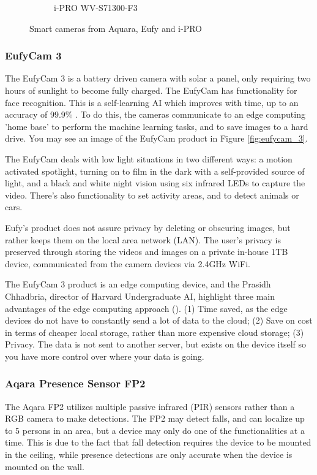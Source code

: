 \begin{figure}[H]
\begin{subfigure}{0.2\textwidth}
        \caption{\centering i-PRO WV-S71300-F3}
        \label{fig:i-PRO_camera}
    \end{subfigure}
    \caption{\centering Smart cameras from Aquara, Eufy and i-PRO}
    \label{fig:solutions_on_the_market}
\end{figure}

\subsubsection{EufyCam 3}
\label{sec:eufycam}
The EufyCam 3 is a battery driven camera with solar a panel, only requiring two hours of sunlight to become fully charged. The EufyCam has functionality for face recognition. This is a self-learning AI which improves with time, up to an accuracy of 99.9\% \cite{eufycam}. To do this, the cameras communicate to an edge computing 'home base' to perform the machine learning tasks, and to save images to a hard drive. You may see an image of the EufyCam product in Figure \ref{fig:eufycam_3}.

The EufyCam deals with low light situations in two different ways: a motion activated spotlight, turning on to film in the dark with a self-provided source of light, and a black and white night vision using six infrared LEDs to capture the video. There's also functionality to set activity areas, and to detect animals or cars.

Eufy's product does not assure privacy by deleting or obscuring images, but rather keeps them on the local area network (LAN). The user's privacy is preserved through storing the videos and images on a private in-house 1TB device, communicated from the camera devices via 2.4GHz WiFi.

The EufyCam 3 product is an edge computing device, and the Prasidh Chhadbria, director of Harvard Undergraduate AI, highlight three main advantages of the edge computing approach (\citeyear{ch2022youtube_edge_computing_eufycam}). (1) Time saved, as the edge devices do not have to constantly send a lot of data to the cloud; (2) Save on cost in terms of cheaper local storage, rather than more expensive cloud storage; (3) Privacy. The data is not sent to another server, but exists on the device itself so you have more control over where your data is going.


\subsubsection{Aqara Presence Sensor FP2}
The Aqara FP2 utilizes multiple passive infrared (PIR) sensors rather than a RGB camera to make detections. The FP2 may detect falls, and can localize up to 5 persons in an area, but a device may only do one of the functionalities at a time. This is due to the fact that fall detection requires the device to be mounted in the ceiling, while presence detections are only accurate when the device is mounted on the wall.

